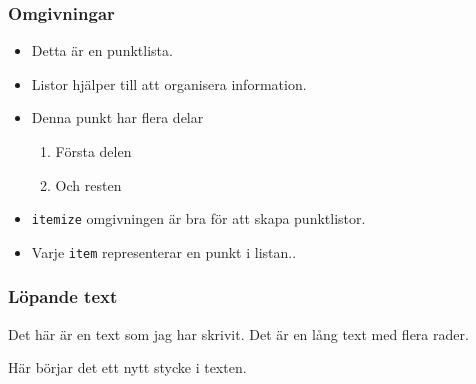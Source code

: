 \begin{frame}[fragile,t]
  \frametitle{Omgivningar}\SlideFontTiny

  \begin{itemize}
  \end{itemize}

  \blankline
  \begin{exlatex}
\begin{itemize}
  \item Detta är en punktlista.
  \item Listor hjälper till att organisera information.
  \item Denna punkt har flera delar
  \begin{enumerate}
    \item Första delen
    \item Och resten
  \end{enumerate}
\end{itemize}
  \end{exlatex}

    \begin{itemize}
      \item \texttt{itemize} omgivningen är bra för att skapa punktlistor.
      \item Varje \texttt{item} representerar en punkt i listan..
    \end{itemize}
\end{frame}



\begin{frame}[fragile,t]
  \frametitle{Löpande text}
  \vspace{1em}
  \begin{itemize}
  \end{itemize}

  \blankline
  \begin{exlatex}
Det här      är en text
 som jag  har skrivit.
Det är
en lång text med flera
     rader.

Här börjar det ett
nytt stycke i texten.
  \end{exlatex}

\end{frame}

